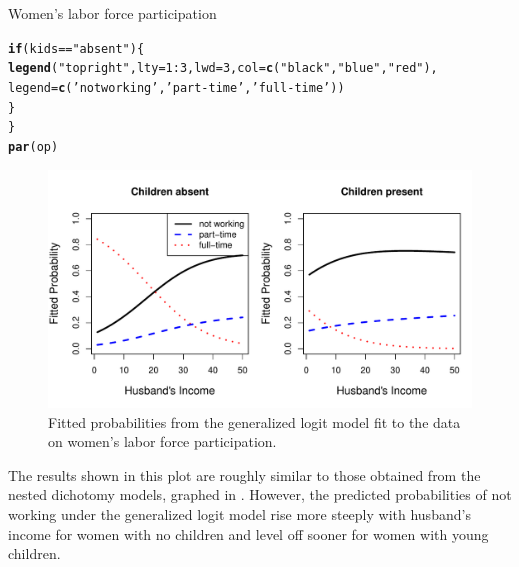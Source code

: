 \documentclass[11pt]{book}\usepackage[]{graphicx}\usepackage[]{color}
\makeatletter
\newcommand{\hlnum}[1]{\textcolor[rgb]{0.686,0.059,0.569}{#1}}%
\newcommand{\hlstr}[1]{\textcolor[rgb]{0.192,0.494,0.8}{#1}}%
\newcommand{\hlopt}[1]{\textcolor[rgb]{0,0,0}{#1}}%
\newcommand{\hlstd}[1]{\textcolor[rgb]{0.345,0.345,0.345}{#1}}%
\newcommand{\hlkwa}[1]{\textcolor[rgb]{0.161,0.373,0.58}{\textbf{#1}}}%
\newcommand{\hlkwc}[1]{\textcolor[rgb]{0.333,0.667,0.333}{#1}}%
\newcommand{\hlkwd}[1]{\textcolor[rgb]{0.737,0.353,0.396}{\textbf{#1}}}%
\newenvironment{kframe}{%
 \def\at@end@of@kframe{}%
 \ifinner\ifhmode%
  \def\at@end@of@kframe{\end{minipage}}%
  \begin{minipage}{\columnwidth}%
 \fi\fi%
 \def\FrameCommand##1{\hskip\@totalleftmargin \hskip-\fboxsep
 \colorbox{shadecolor}{##1}\hskip-\fboxsep
     \hskip-\linewidth \hskip-\@totalleftmargin \hskip\columnwidth}%
 \MakeFramed {\advance\hsize-\width
   \@totalleftmargin\z@ \linewidth\hsize
   \@setminipage}}%
 {\par\unskip\endMakeFramed%
 \at@end@of@kframe}
\newenvironment{knitrout}{}{} %
\renewenvironment{knitrout}{\small\renewcommand{\baselinestretch}{.85}}{} %
\makeatother
\begin{document}
\begin{Example}[wlfpart2]{Women's labor force participation}
\begin{knitrout}
\begin{kframe}
\begin{alltt}
  \hlkwa{if} \hlstd{(kids}\hlopt{==}\hlstr{"absent"}\hlstd{) \{}
  \hlkwd{legend}\hlstd{(}\hlstr{"topright"}\hlstd{,} \hlkwc{lty}\hlstd{=}\hlnum{1}\hlopt{:}\hlnum{3}\hlstd{,} \hlkwc{lwd}\hlstd{=}\hlnum{3}\hlstd{,} \hlkwc{col}\hlstd{=}\hlkwd{c}\hlstd{(}\hlstr{"black"}\hlstd{,} \hlstr{"blue"}\hlstd{,} \hlstr{"red"}\hlstd{),}
    \hlkwc{legend}\hlstd{=}\hlkwd{c}\hlstd{(}\hlstr{'not working'}\hlstd{,} \hlstr{'part-time'}\hlstd{,} \hlstr{'full-time'}\hlstd{))}
    \hlstd{\}}
\hlstd{\}}
\hlkwd{par}\hlstd{(op)}
\end{alltt}
\end{kframe}\begin{figure}[!htbp]


\centerline{\includegraphics[width=.9\textwidth]{ch07/fig/wlf-multi-prob-1} }

\caption[Fitted probabilities from the generalized logit model fit to the data on women's labor force participation]{Fitted probabilities from the generalized logit model fit to the data on women's labor force participation.\label{fig:wlf-multi-prob}}
\end{figure}


\end{knitrout}
The results shown in this plot are roughly similar to those obtained from the nested dichotomy models,
graphed in . However,
the predicted probabilities of not working under the generalized logit model rise more steeply
with husband's income for women with no children and level off sooner for women with
young children.


\end{Example}
\end{document}
